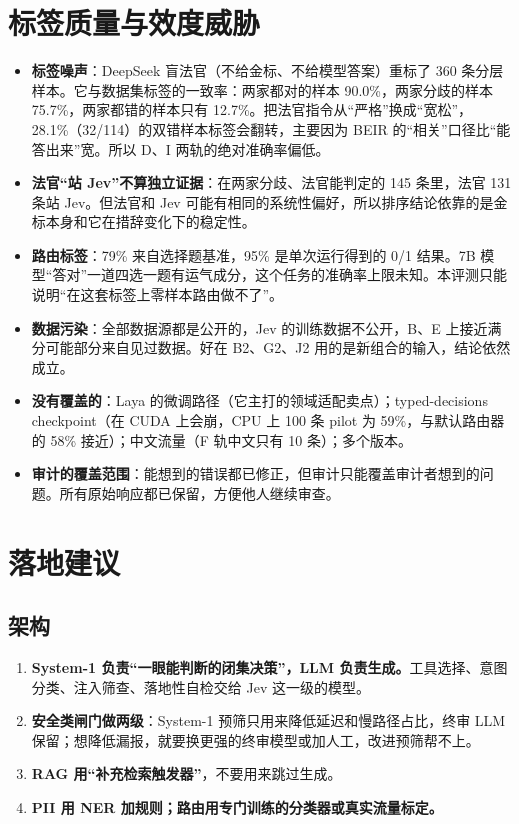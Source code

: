 \documentclass[UTF8,fontset=none,zihao=-4]{ctexart}
\newcommand{\laya}{\textsf{Laya}}
\newcommand{\jev}{\textsf{Jev}}
\begin{document}
\section{标签质量与效度威胁}
\begin{itemize}
\item \textbf{标签噪声}：DeepSeek 盲法官（不给金标、不给模型答案）重标了 360 条分层样本。它与数据集标签的一致率：两家都对的样本 90.0\%，两家分歧的样本 75.7\%，两家都错的样本只有 12.7\%。把法官指令从“严格”换成“宽松”，28.1\%（32/114）的双错样本标签会翻转，主要因为 BEIR 的“相关”口径比“能答出来”宽。所以 D、I 两轨的绝对准确率偏低。
\item \textbf{法官“站 \jev{}”不算独立证据}：在两家分歧、法官能判定的 145 条里，法官 131 条站 \jev{}。但法官和 \jev{} 可能有相同的系统性偏好，所以排序结论依靠的是金标本身和它在措辞变化下的稳定性。
\item \textbf{路由标签}：79\% 来自选择题基准，95\% 是单次运行得到的 0/1 结果。7B 模型“答对”一道四选一题有运气成分，这个任务的准确率上限未知。本评测只能说明“在这套标签上零样本路由做不了”。
\item \textbf{数据污染}：全部数据源都是公开的，\jev{} 的训练数据不公开，B、E 上接近满分可能部分来自见过数据。好在 B2、G2、J2 用的是新组合的输入，结论依然成立。
\item \textbf{没有覆盖的}：\laya{} 的微调路径（它主打的领域适配卖点）；typed-decisions checkpoint（在 CUDA 上会崩，CPU 上 100 条 pilot 为 59\%，与默认路由器的 58\% 接近）；中文流量（F 轨中文只有 10 条）；多个版本。
\item \textbf{审计的覆盖范围}：能想到的错误都已修正，但审计只能覆盖审计者想到的问题。所有原始响应都已保留，方便他人继续审查。
\end{itemize}

\section{落地建议}\label{sec:reco}
\subsection{架构}
\begin{enumerate}
\item \textbf{System-1 负责“一眼能判断的闭集决策”，LLM 负责生成。}工具选择、意图分类、注入筛查、落地性自检交给 \jev{} 这一级的模型。
\item \textbf{安全类闸门做两级}：System-1 预筛只用来降低延迟和慢路径占比，终审 LLM 保留；想降低漏报，就要换更强的终审模型或加人工，改进预筛帮不上。
\item \textbf{RAG 用“补充检索触发器”}，不要用来跳过生成。
\item \textbf{PII 用 NER 加规则；路由用专门训练的分类器或真实流量标定。}
\end{enumerate}
\end{document}
